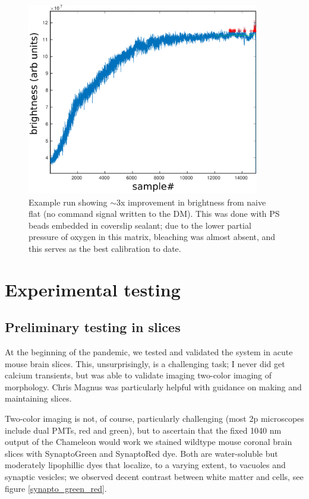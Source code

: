 \documentclass[a4paper,12pt]{article}
\begin{document}
\begin{figure}
\centering
\includegraphics[width=4in]{PSbeads_optimization_run.pdf}
\caption{Example run showing $\sim$3x improvement in brightness from naive flat (no command signal written to the DM).  This was done with PS beads embedded in coverslip sealant; due to the lower partial pressure of oxygen in this matrix, bleaching was almost absent, and this serves as the best calibration to date.}
\end{figure}

\section{Experimental testing}

\subsection{Preliminary testing in slices}

At the beginning of the pandemic, we tested and validated the system in acute mouse brain slices.  This, unsurprisingly, is a challenging task; I never did get calcium transients, but was able to validate imaging two-color imaging of morphology. Chris Magnus was particularly helpful with guidance on making and maintaining slices. 

Two-color imaging is not, of course, particularly challenging (most 2p microscopes include dual PMTs, red and green), but to ascertain that the fixed 1040 nm output of the Chameleon would work we stained wildtype mouse coronal brain slices with SynaptoGreen and SynaptoRed dye.  Both are water-soluble but moderately lipophillic dyes that localize, to a varying extent, to vacuoles and synaptic vesicles; we observed decent contrast between white matter and cells, see figure \ref{synapto_green_red}. 
\end{document}
